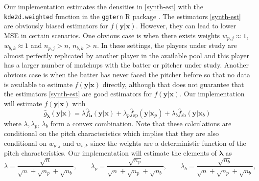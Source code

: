 \documentclass[11pt]{article}
\newcommand{\y}{\textbf{y}}
\newcommand{\x}{\textbf{x}}
\newcommand{\h}{\textbf{h}}
\newcommand{\wstar}{w^{\textstyle{*}}}
\newcommand{\lambdabf}{\boldsymbol{\lambda}}
\begin{document}

Our implementation estimates the densities in \eqref{synth-est} with the \texttt{kde2d.weighted} function in the \texttt{ggtern} R package \citep{ggtern}. The estimators \eqref{synth-est} are obviously biased estimators for $f(\y|\x)$. However, they can lead to lower MSE in certain scenarios. One obvious case is when there exists weights $w_{p,j} \approx 1$, $w_{b,k} \approx 1$  and $n_{p,j} > n$, $n_{b,k} > n$. In these settings, the players under study are almost perfectly replicated by another player in the available pool and this player has a larger number of matchups with the batter or pitcher under study. Another obvious case is when the batter has never faced the pitcher before so that no data is available to estimate $f(\y|\x)$ directly, although that does not guarantee that the estimators \eqref{synth-est} are good estimators for $f(\y|\x)$. Our implementation will estimate $f(\y|\x)$ with
\begin{equation} \label{sd-implem}
  \hat{g}_{\lambdabf}(\y|\x) = \lambda \hat f_\h(\y|\x) 
    + \lambda_p \hat f_{\text{sp}}(\y|\x_p) 
    + \lambda_b \hat f_{\text{sb}}(\y|\x_b)
\end{equation}
where $\lambda,\lambda_p$, $\lambda_b$ form a convex combination. %
Note that these calculations are conditional on the pitch characteristics which implies that they are also conditional on $w_{p,j}$ and $w_{b,k}$ since the weights are a deterministic function of the pitch characteristics. Our implementation will estimate the elements of $\lambdabf$ as 
$$
  \lambda = \frac{\sqrt{n}}{\sqrt{n} + \sqrt{n_p} + \sqrt{n_b}}, \qquad
  \lambda_p = \frac{\sqrt{n_p}}{\sqrt{n} + \sqrt{n_p} + \sqrt{n_b}}, \qquad
  \lambda_b = \frac{\sqrt{n_b}}{\sqrt{n} + \sqrt{n_p} + \sqrt{n_b}},
$$
\end{document}
